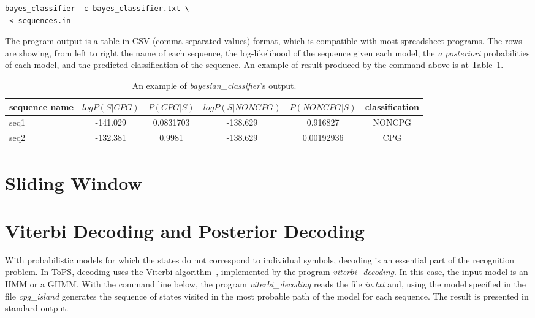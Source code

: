 \begin{Verbatim}[frame=single, label={Command line}]
bayes_classifier -c bayes_classifier.txt \
 < sequences.in
\end{Verbatim}

The program output is a table in CSV (comma separated values) format, which is compatible with most spreadsheet programs. The rows are showing, from left to right the name of each sequence, the log-likelihood of the sequence given each model, the \textit{a posteriori} probabilities of each model, and the predicted classification of the sequence. An example of result produced by the command above is at Table~\ref{tab:bayes}.

\begin{table}
  \begin{tabular*}{\textwidth}[t!]{@{\extracolsep{\fill}}lccccc}\toprule
   sequence name & $log P(S|CPG)$ & $P(CPG|S)$ &  $log P(S|NONCPG)$ & $P(NONCPG|S)$ & classification \\ \hline
   seq1&-141.029&0.0831703&-138.629&0.916827&NONCPG \\
   seq2&-132.381&0.9981&-138.629&0.00192936&CPG \\ \bottomrule
 \end{tabular*}
 \caption{An example of \textit{ bayesian\_classifier}'s output.}
 \label{tab:bayes}
\end{table}



\section{Sliding Window}


\section{Viterbi Decoding and Posterior Decoding}

With probabilistic models for which the states do not correspond to individual symbols, decoding is an essential part of the recognition problem. In ToPS, decoding uses the Viterbi algorithm~\cite{Rabiner1989}, implemented by the program \textit{viterbi\_decoding}. In this case, the input model is an HMM or a GHMM. With the command line below, the program \textit{viterbi\_decoding} reads the file \textit{in.txt} and, using the model specified in the file \textit{cpg\_island} generates the sequence of states visited in the most probable path of the model for each sequence. The result is presented in standard output.

